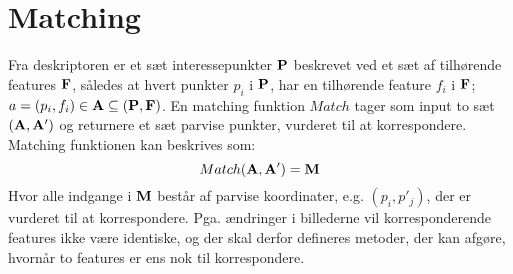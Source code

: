 \section{Matching}
Fra deskriptoren er et sæt interessepunkter $\bold{P}$ beskrevet ved et sæt af tilhørende features $\bold{F}$, således at hvert punkter $p_i$ i $\bold{P}$, har en tilhørende feature $f_i$ i $\bold{F}$; $a = (p_i, f_i) \in \bold{A} \subseteq (\bold{P}, \bold{F})$. En matching funktion $Match$ tager som input to sæt $(\bold{A},\bold{A'})$ og returnere et sæt parvise punkter, vurderet til at korrespondere. Matching funktionen kan beskrives som:
\begin{equation}
Match(\bold{A}, \bold{A}') = \bold{M}
\end{equation}
Hvor alle indgange i $\bold{M}$ består af parvise koordinater, e.g. $(p_i, p'_j)$, der er vurderet til at korrespondere. Pga. ændringer i billederne vil korresponderende features ikke være identiske, og der skal derfor defineres metoder, der kan afgøre, hvornår to features er ens nok til korrespondere.